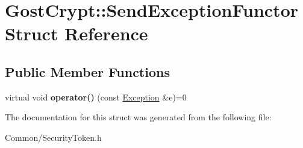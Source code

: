 \hypertarget{struct_gost_crypt_1_1_send_exception_functor}{}\section{Gost\+Crypt\+:\+:Send\+Exception\+Functor Struct Reference}
\label{struct_gost_crypt_1_1_send_exception_functor}
\subsection*{Public Member Functions}
\begin{DoxyCompactItemize}
\item 
\mbox{\label{struct_gost_crypt_1_1_send_exception_functor_ad8d3aa4c47a3fb2ac9f886dc7474fc91}} 
virtual void {\bfseries operator()} (const \hyperlink{struct_gost_crypt_1_1_exception}{Exception} \&e)=0
\end{DoxyCompactItemize}


The documentation for this struct was generated from the following file\+:\begin{DoxyCompactItemize}
\item 
Common/Security\+Token.\+h\end{DoxyCompactItemize}
